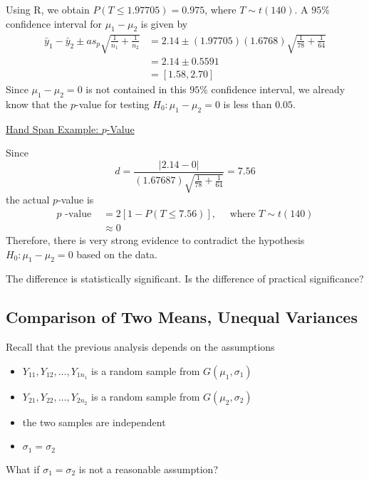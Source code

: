 \begin{exbox}
    \begin{example}
        Using R, we obtain $ P(T\leqslant 1.97705)=0.975 $, where $ T\sim t(140) $.
        A $ 95\% $ confidence interval for $ \mu_1-\mu_2 $ is given by
        \[\begin{aligned}
                \bar{y}_{1}-\bar{y}_{2} \pm a s_{p} \sqrt{\frac{1}{n_{1}}+\frac{1}{n_{2}}} & =2.14 \pm(1.97705)(1.6768) \sqrt{\frac{1}{78}+\frac{1}{64}} \\
                                                                                           & =2.14 \pm 0.5591                                            \\
                                                                                           & =[1.58,2.70]
            \end{aligned}\]
        Since $ \mu_1-\mu_2=0 $ is not contained in this $ 95\% $ confidence interval, we already
        know that the $ p $-value for testing $ H_0:\mu_1-\mu_2=0 $ is less than $ 0.05 $.

        \underline{Hand Span Example: $ p $-Value}

        Since
        \[d=\frac{|2.14-0|}{(1.67687) \sqrt{\frac{1}{78}+\frac{1}{64}}}=7.56\]
        the actual $ p $-value is
        \[\begin{aligned}
                p \text { -value } & =2[1-P(T \leq 7.56)], \quad \text { where } T \sim t(140) \\
                                   & \approx 0
            \end{aligned}\]
        Therefore, there is very strong evidence to contradict the hypothesis $ H_0:\mu_1-\mu_2=0 $
        based on the data.

        The difference is statistically significant. Is the difference of practical significance?
    \end{example}
\end{exbox}

\subsection{Comparison of Two Means, Unequal Variances}
Recall that the previous analysis depends on the assumptions
\begin{itemize}
    \item $ Y_{11},Y_{12},\ldots ,Y_{1n_1} $ is a random sample from $ G(\mu_1,\sigma_1) $
    \item $ Y_{21},Y_{22},\ldots ,Y_{2n_2} $ is a random sample from $ G(\mu_2,\sigma_2) $
    \item the two samples are independent
    \item $ \sigma_1=\sigma_2 $
\end{itemize}
What if $ \sigma_1=\sigma_2 $ is not a reasonable assumption?

